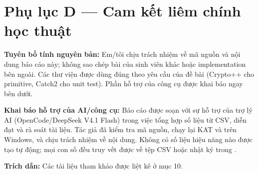 \documentclass[12pt,a4paper,oneside]{report}
\let\origtexttt\texttt
\renewcommand{\texttt}[1]{\origtexttt{\seqsplit{#1}}}
\begin{document}
\section{Phụ lục D — Cam kết liêm chính học thuật}


\textbf{Tuyên bố tính nguyên bản:} Em/tôi chịu trách nhiệm về mã nguồn và nội dung báo cáo này; không sao chép bài của sinh viên khác hoặc implementation bên ngoài. Các thư viện được dùng đúng theo yêu cầu của đề bài (Crypto++ cho primitive, Catch2 cho unit test). Phần hỗ trợ của công cụ được khai báo ngay bên dưới.


\textbf{Khai báo hỗ trợ của AI/công cụ:} Báo cáo được soạn với sự hỗ trợ của trợ lý AI (OpenCode/DeepSeek V4.1 Flash) trong việc tổng hợp số liệu từ CSV, diễn đạt và rà soát tài liệu. Tác giả đã kiểm tra mã nguồn, chạy lại KAT và \texttt{ctest} trên Windows, và chịu trách nhiệm về nội dung. Không có số liệu hiệu năng nào được tạo tự động; mọi con số đều truy vết được về tệp CSV hoặc nhật ký trong \texttt{output/}.


\textbf{Trích dẫn:} Các tài liệu tham khảo được liệt kê ở mục 10.

\clearpage
\end{document}
